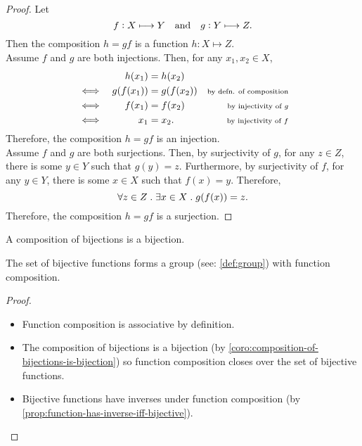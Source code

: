 \documentclass[../MathsNotesBase.tex]{subfiles}
\begin{document}
{		\bigskip
		\begin{proof}
			Let 
			\[ f: X \longmapsto Y \hspace{10pt}\text{and}\hspace{10pt} g: Y \longmapsto Z. \]
			Then the composition ${ h = gf }$ is a function ${ h: X \longmapsto Z }$.\\
			
			Assume $f$ and $g$ are both injections. Then, for any ${ x_1, x_2 \in X }$,
			\[\begin{aligned}
				&& h(x_1) &= h(x_2) \\
				&\iff & g(f(x_1)) &= g(f(x_2)) &\text{\scriptsize{by defn. of composition}} \\
				&\iff & f(x_1) &= f(x_2) &\text{\scriptsize{by injectivity of $g$}} \\
				&\iff & x_1 &= x_2. &\text{\scriptsize{by injectivity of $f$}}
			\end{aligned}\]
			Therefore, the composition $h = gf$ is an injection.\\
			
			Assume $f$ and $g$ are both surjections. Then, by surjectivity of $g$, for any ${ z \in Z }$, there is some ${ y \in Y }$ such that ${ g(y) = z }$.
			Furthermore, by surjectivity of $f$, for any ${ y \in Y }$, there is some ${ x \in X }$ such that ${ f(x) = y }$. Therefore,
			\[ \forall z \in Z \;.\; \exists x \in X \;.\; g(f(x)) = z. \]
			Therefore, the composition $h = gf$ is a surjection.
		\end{proof}
		\begin{corollary}\label{coro:composition-of-bijections-is-bijection}
			A composition of bijections is a bijection.
		\end{corollary}
		\medskip
		\begin{corollary}
			The set of bijective functions forms a group (see: \ref{def:group}) with function composition.
		\end{corollary}
		\begin{proof}\nl
			\begin{itemize}
				\item Function composition is associative by definition.
				\item The composition of bijections is a bijection (by \autoref{coro:composition-of-bijections-is-bijection}) so function composition closes over the set of bijective functions.
				\item Bijective functions have inverses under function composition (by \autoref{prop:function-has-inverse-iff-bijective}).
			\end{itemize}
		\end{proof}
		
}
\end{document}
